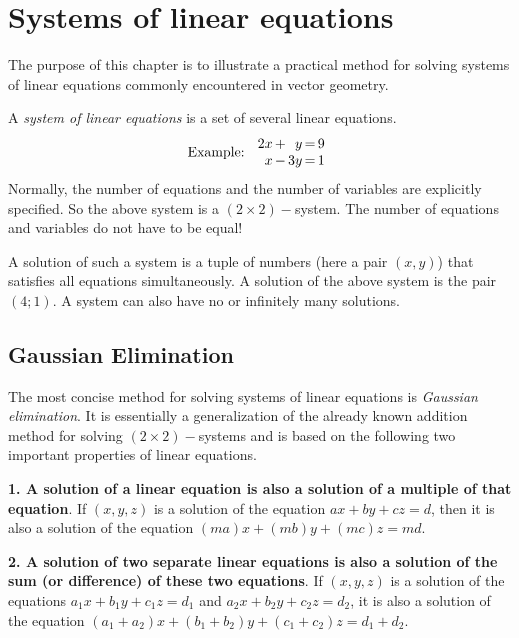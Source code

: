 \documentclass[12pt,eng]{skript_ogg}
\begin{document}
\section{Systems of linear equations}
The purpose of this chapter is to illustrate a practical method for solving systems of linear equations commonly encountered in vector geometry.

\begin{defn}
A \emph{system of linear equations} is a set of several linear equations. 
\[\text{Example: }\begin{array}{r@{\,}c@{\,}r@{\,}c@{\,}l}
2x & + & y  & = & 9\\
x  & - & 3y & = & 1
\end{array}\]
Normally, the number of equations and the number of variables are explicitly specified. So the above system is a $(2\times2)-$system. The number of equations and variables do not have to be equal!

A solution of such a system is a tuple of numbers (here a pair $(x,y)$) that satisfies all equations simultaneously. A solution of the above system is the pair $(4;1)$. A system can also have no or infinitely many solutions.
\end{defn}

\vspace{-7mm}

\subsection{Gaussian Elimination}
The most concise method for solving systems of linear equations is \emph{Gaussian elimination}. It is essentially a generalization of the already known addition method for solving $(2\times2)-$systems and is based on the following two important properties of linear equations.

\begin{wichtig}
\textbf{1. A solution of a linear equation is also a solution of a multiple of that equation}. If $(x,y,z)$ is a solution of the equation $ax+by+cz=d$, then it is also a solution of the equation $(ma)x+(mb)y+(mc)z=md$.

\textbf{2. A solution of two separate linear equations is also a solution of the sum (or difference) of these two equations}. If $(x,y,z)$ is a solution of the equations $a_1x+b_1y+c_1z=d_1$ and $a_2x+b_2y+c_2z=d_2$, it is also a solution of the equation $(a_1+a_2)x+(b_1+b_2)y+(c_1+c_2)z=d_1+d_2$.
\end{wichtig}
\end{document}
